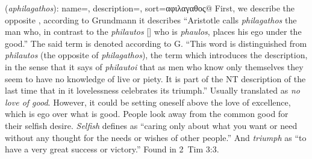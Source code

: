 \item[Selfish triumph,]

(\textit{aphilagathos}):
{
    name=,
    description={},
    sort=αφιλαγαθος@
}
First, we describe the opposite , according to Grundmann it describes ``Aristotle calls \emph{philagathos} the man who, in contrast to the \emph{philautos} [] who is \emph{phaulos}, places his ego under the good.''
The said term is denoted according to G. ``This word is distinguished from \emph{philautos} (the opposite of  \emph{philagathos}),  the term which introduces the description, in the sense that it says of \emph{philautoi} that as men who know only themselves they seem to have no knowledge of live or piety. It is part of the NT description of the last time that in it lovelessness celebrates its triumph.''
Usually translated as \emph{no love of good}. However, it could be setting oneself above the love of excellence, which is ego over what is good. People look away from the common good for their selfish desire. \emph{Selfish} defines as ``caring only about what you want or need without any thought for the needs or wishes of other people.'' And \emph{triumph} as ``to have a very great success or victory.''
Found in 2~Tim 3:3.
